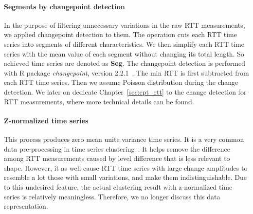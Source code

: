 \paragraph*{Segments by changepoint detection} In the purpose of filtering unnecessary variations in the raw RTT measurements, we applied changepoint detection to them. The operation cuts each RTT time series into segments of different characteristics. We then simplify each RTT time series with the mean value of each segment without changing its total length. So achieved time series are denoted as \textbf{Seg}. The changepoint detection is performed with R package \textit{changepoint}, version 2.2.1~\cite{Killick2013a}. The min RTT is first subtracted from each RTT time series. Then we assume Poisson distribution during the change detection. We later on dedicate  Chapter~\ref{sec:cpt_rtt} to the change detection for RTT measurements, where more technical details can be found.

\paragraph*{Z-normalized time series} This process produces zero mean unite variance time series. It is a very common data pre-processing in time series clustering~\cite{Ulanova2015,Ratanamahatana2004}. It helps remove the difference among RTT measurements caused by level difference that is less relevant to shape. However, it as well cause RTT time series with large change amplitudes to resemble a lot those with small variations, and make them indistinguishable. Due to this undesired feature, the actual clustering result with z-normalized time series is relatively meaningless. Therefore, we no longer discuss this data representation.


